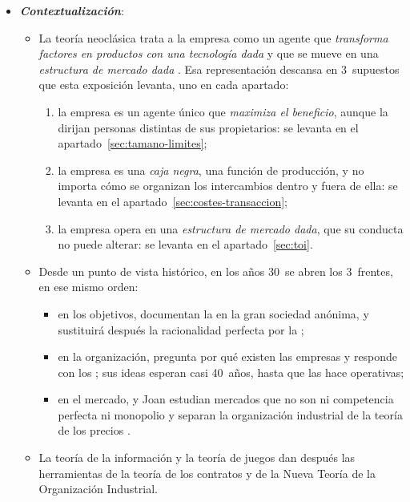 \documentclass[11pt]{article}
\begin{document}
\begin{itemize}
\item \textbf{\emph{Contextualización}}:
  \begin{itemize}
  \item La teoría neoclásica trata a la empresa como un agente que \emph{transforma factores en productos con una tecnología dada}   y que se mueve en una \emph{estructura de mercado dada} . Esa representación descansa en 3~supuestos que esta exposición levanta, uno en cada apartado:
    \begin{enumerate}
    \item la empresa es un agente único que \emph{maximiza el beneficio}, aunque la dirijan personas distintas de sus propietarios: se levanta en el apartado~\ref{sec:tamano-limites};
    \item la empresa es una \emph{caja negra}, una función de producción, y no importa cómo se organizan los intercambios dentro y fuera de ella: se levanta en el apartado~\ref{sec:costes-transaccion};
    \item la empresa opera en una \emph{estructura de mercado dada}, que su conducta no puede alterar: se levanta en el apartado~\ref{sec:toi}.
    \end{enumerate}
  \item Desde un punto de vista histórico, en los años 30~se abren los 3~frentes, en ese mismo orden:
    \begin{itemize}
    \item en los objetivos, \textcite{BerleMeans1932Modern} documentan la  en la gran sociedad anónima, y \textcite{Simon1955Behavioral} sustituirá después la racionalidad perfecta por la  ;
    \item en la organización, \textcite{Coase1937Nature} pregunta por qué existen las empresas y responde con los ; sus ideas esperan casi 40~años, hasta que \textcite{Williamson1975Markets} las hace operativas;
    \item en el mercado, \textcite{Chamberlin1933Theory} y Joan \textcite{Robinson1933Economics} estudian mercados que no son ni competencia perfecta ni monopolio y separan la organización industrial de la teoría de los precios .
    \end{itemize}
  \item La teoría de la información  y la teoría de juegos  dan después las herramientas de la teoría de los contratos y de la Nueva Teoría de la Organización Industrial.

\end{itemize}
\end{itemize}
\end{document}
